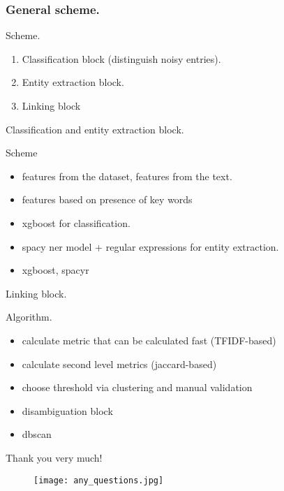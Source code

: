 \documentclass{beamer}
\begin{document}
\begin{frame}
\frametitle{General scheme.}
\begin{block}{Scheme.}
\begin{enumerate}
	\item Classification block (distinguish noisy entries).
	\item Entity extraction block.
	\item Linking block
\end{enumerate}
\end{block}
\end{frame}
\begin{frame}{Classification and entity extraction block.}
\begin{block}{Scheme}
\begin{itemize}
	\item features from the dataset, features from the text.
	\item features based on presence of key words
	\item xgboost for classification.
	\item spacy ner model + regular expressions for entity extraction.
	\item xgboost, spacyr
\end{itemize}
\end{block}
\end{frame}
\begin{frame}{Linking block.}
\begin{block}{Algorithm.}
\begin{itemize}
	\item calculate metric that can be calculated fast (TFIDF-based)
	\item calculate second level metrics (jaccard-based)
	\item choose threshold via clustering and manual validation
	\item disambiguation block
	\item dbscan
\end{itemize}
\end{block}
\end{frame}
\begin{frame}{Thank you very much!}
\begin{figure}[h!]
\centering
\texttt{[image: any\_questions.jpg]}
\end{figure}
\end{frame}
\end{document}
